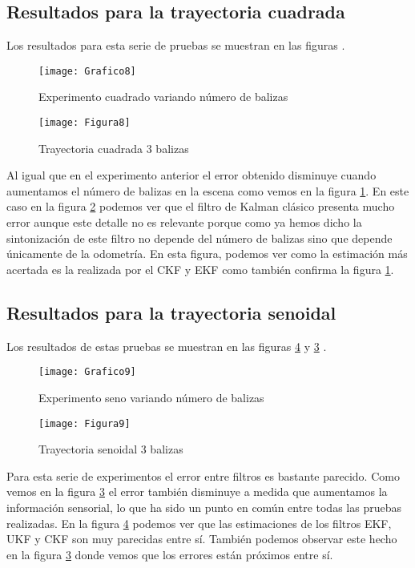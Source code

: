 \subsection{Resultados para la trayectoria cuadrada}
Los resultados para esta serie de pruebas se muestran en las figuras .
\begin{figure}[ht!]
\centering
\texttt{[image: Grafico8]}
\caption{Experimento cuadrado variando número de balizas} \label{Grafico8}
\end{figure}
\begin{figure}[ht!]
\centering
\texttt{[image: Figura8]}
\caption{Trayectoria cuadrada 3 balizas} \label{Figura8}
\end{figure}
Al igual que en el experimento anterior el error obtenido disminuye cuando aumentamos el número de balizas en la escena como vemos en la figura \ref{Grafico8}.
En este caso en la figura \ref{Figura8} podemos ver que el filtro de Kalman clásico presenta mucho error aunque este detalle no es relevante porque como ya hemos dicho la sintonización de este filtro no depende del número de balizas sino que depende únicamente de la odometría.
En esta figura, podemos ver como la estimación más acertada es la realizada por el \ac{CKF} y \ac{EKF} como también confirma la figura \ref{Grafico8}.

\subsection{Resultados para la trayectoria senoidal}
Los resultados de estas pruebas se muestran en las figuras \ref{Figura9} y \ref{Grafico9} .
\begin{figure}[ht!]
\centering
\texttt{[image: Grafico9]}
\caption{Experimento seno variando número de balizas} \label{Grafico9}
\end{figure}
\begin{figure}[ht!]
\centering
\texttt{[image: Figura9]}
\caption{Trayectoria senoidal 3 balizas} \label{Figura9}
\end{figure}
Para esta serie de experimentos el error entre filtros es bastante parecido.
Como vemos en la figura \ref{Grafico9} el error también disminuye a medida que aumentamos la información sensorial, lo que ha sido un punto en común entre todas las pruebas realizadas.
En la figura \ref{Figura9} podemos ver que las estimaciones de los filtros \ac{EKF}, \ac{UKF} y \ac{CKF} son muy parecidas entre sí.
También podemos observar este hecho en la figura \ref{Grafico9} donde vemos que los errores están próximos entre sí.

